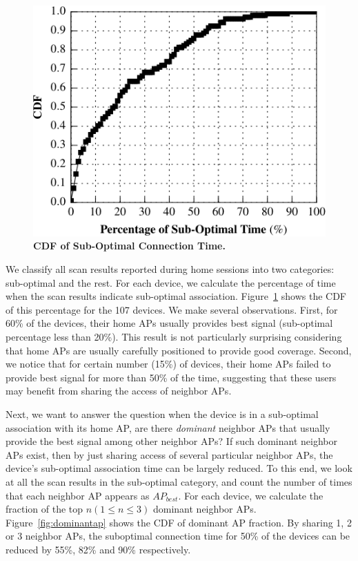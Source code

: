 \begin{figure}[t]
  \centering
  \includegraphics[width=\columnwidth]{./figures/HomeAPSessionRSSI.pdf}
  \caption{\textbf{CDF of Sub-Optimal Connection Time.}}
  \label{fig:suboptimal}
  \vspace*{-4mm}
\end{figure}

We classify all scan results reported during home \wifi{} sessions into
two categories: sub-optimal and the rest. For each device, we calculate the
percentage of time when the scan results indicate sub-optimal association.
Figure~\ref{fig:suboptimal} shows the CDF of this percentage for 
the 107 devices. We make several observations. First, for 60\% of the devices,
their home APs usually provides best signal (sub-optimal percentage less than
20\%). This result is not particularly surprising considering that home APs are
usually carefully positioned to provide good coverage. Second, we notice
that for certain number (15\%) of devices, their home APs failed to provide best
signal for more than 50\% of the time, suggesting that these users may benefit
from sharing the \wifi{} access of neighbor APs.

Next, we want to answer the question when the device is in a sub-optimal association
with its home AP, are there \textit{dominant} neighbor APs that
usually provide the best signal among other neighbor APs? If such dominant
neighbor APs exist, then by just sharing access of several particular neighbor
APs, the device's sub-optimal association time can be largely reduced. To this
end, we look at all the scan results in the sub-optimal category, and count the
number of times that each neighbor AP appears as $AP_{best}$. For each device,
we calculate the fraction of the top $n (1 \le n \le 3)$ dominant neighbor APs.
Figure~\ref{fig:dominantap} shows the CDF of dominant AP fraction. By sharing 1,
2 or 3 neighbor APs, the suboptimal connection time for 50\% of the devices can be
reduced by 55\%, 82\% and 90\% respectively.


